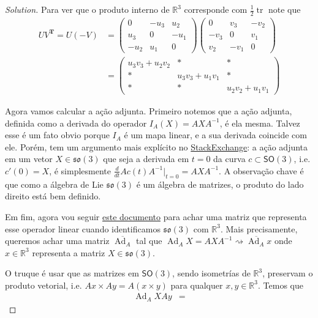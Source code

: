 \begin{proof}[Solution]
Para ver que o produto interno de $\mathbb{R}^{3}$ corresponde com $\frac{1}{2}\operatorname{tr}$ note que
\begin{align*}
	UV^{\mathbf{T}}=U(-V)&=\begin{pmatrix} 0&-u_3&u_2\\u_3&0&-u_1\\-u_2&u_1&0 \end{pmatrix} \begin{pmatrix} 0&v_3&-v_2\\-v_3&0&v_1\\v_2&-v_1&0 \end{pmatrix} \\
		       &=\begin{pmatrix} u_3v_3+u_2v_2&*&*\\ *&u_3v_3+u_1v_1&*\\ *&*&u_2v_2+u_1v_1 \end{pmatrix} 
\end{align*}

Agora vamos calcular a ação adjunta. 
Primeiro notemos que a ação adjunta, definida como a derivada do operador $I_A(X)=AXA^{-1}$, é ela mesma. Talvez esse é um fato obvio porque $I_A$  é um mapa linear, e a sua derivada coincide com ele. Porém, tem um argumento mais explícito no \href{https://math.stackexchange.com/questions/512026/prove-that-the-action-of-a-lie-group-on-its-lie-algebra-via-the-adjoint-represen}{StackExchange}: a ação adjunta em um vetor  $X\in\mathfrak{so}(3)$ que seja a derivada em $t=0$ da curva $c\subset \mathsf{SO}(3)$, i.e.  $c'(0)=X$, é simplesmente $\frac{d}{dt}Ac(t)A^{-1}\Big|_{t=0}=AXA^{-1}$. A observação chave é que como a álgebra de Lie $\mathfrak{so}(3)$ é um álgebra de matrizes, o produto do lado direito está bem definido.

Em fim, agora vou seguir \href{https://www.ethaneade.org/lie.pdf}{este documento} para achar uma matriz que representa esse operador linear cuando identificamos $\mathfrak{so}(3)$ com $\mathbb{R}^{3}$. Mais precisamente, queremos achar uma matriz  $\overline{\operatorname{Ad}_A}$ tal que $\operatorname{Ad}_AX=AXA^{-1}\rightsquigarrow \overline{\operatorname{Ad}_A}x$ onde $x\in\mathbb{R}^{3}$  representa a matriz $X\in\mathfrak{so}(3)$.

O truque é usar que as matrizes em $\mathsf{SO}(3)$, sendo isometrías de $\mathbb{R}^{3}$, preservam o produto vetorial, i.e. $Ax\times Ay=A(x \times y)$ para qualquer $x,y\in\mathbb{R}^{3}$. Temos que
\begin{align*}
	\operatorname{Ad}_AXAy&=
\end{align*}
\end{proof}


